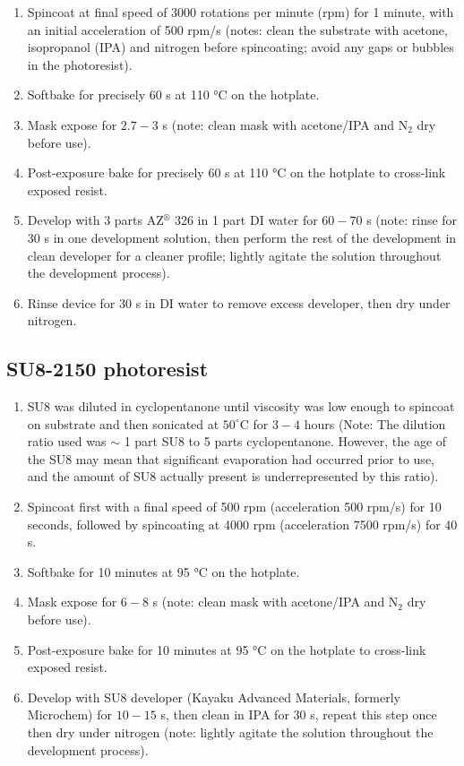 \documentclass[
  a4paper,
]{scrbook}
\begin{document}
\begin{enumerate}
\def\labelenumi{\arabic{enumi}.}
\item
  Spincoat at final speed of 3000 rotations per minute (rpm) for 1
  minute, with an initial acceleration of 500 rpm/s (notes: clean the
  substrate with acetone, isopropanol (IPA) and nitrogen before
  spincoating; avoid any gaps or bubbles in the photoresist).
\item
  Softbake for precisely 60 s at 110 °C on the hotplate.
\item
  Mask expose for \(2.7-3\) s (note: clean mask with acetone/IPA and
  N\(_2\) dry before use).
\item
  Post-exposure bake for precisely 60 s at 110 °C on the hotplate to
  cross-link exposed resist.
\item
  Develop with 3 parts AZ\(^\circledR\) 326 in 1 part DI water for
  \(60-70\) s (note: rinse for 30 s in one development solution, then
  perform the rest of the development in clean developer for a cleaner
  profile; lightly agitate the solution throughout the development
  process).
\item
  Rinse device for 30 s in DI water to remove excess developer, then dry
  under nitrogen.
\end{enumerate}

\hypertarget{su8-2150-photoresist}{%
\subsection{SU8-2150 photoresist}\label{su8-2150-photoresist}}

\begin{enumerate}
\def\labelenumi{\arabic{enumi}.}
\item
  SU8 was diluted in cyclopentanone until viscosity was low enough to
  spincoat on substrate and then sonicated at \(50^\circ\)C for \(3-4\)
  hours (Note: The dilution ratio used was \(\sim\) 1 part SU8 to 5
  parts cyclopentanone. However, the age of the SU8 may mean that
  significant evaporation had occurred prior to use, and the amount of
  SU8 actually present is underrepresented by this ratio).
\item
  Spincoat first with a final speed of 500 rpm (acceleration 500 rpm/s)
  for 10 seconds, followed by spincoating at 4000 rpm (acceleration 7500
  rpm/s) for 40 s.
\item
  Softbake for 10 minutes at 95 °C on the hotplate.
\item
  Mask expose for \(6-8\) s (note: clean mask with acetone/IPA and
  N\(_2\) dry before use).
\item
  Post-exposure bake for 10 minutes at 95 °C on the hotplate to
  cross-link exposed resist.
\item
  Develop with SU8 developer (Kayaku Advanced Materials, formerly
  Microchem) for \(10-15\) s, then clean in IPA for 30 s, repeat this
  step once then dry under nitrogen (note: lightly agitate the solution
  throughout the development process).
\end{enumerate}
\end{document}
